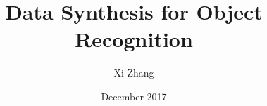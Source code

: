 \documentclass{iitthesis}
\begin{document}
\title{Data Synthesis for Object Recognition}
\author{Xi Zhang}
\date{December 2017}
\copyrightnoticetrue      %
\maketitle                %


\prelimpages         %




\tableofcontents
\clearpage

\listoftables
\clearpage

\listoffigures
\clearpage


%

 \clearpage
\end{document}
